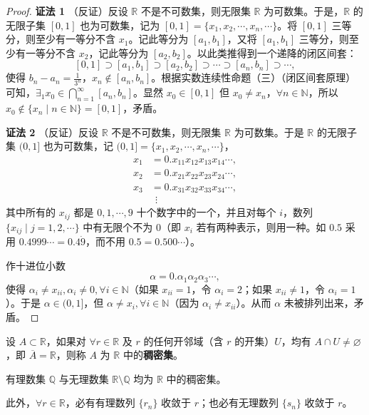 \begin{proof}
\textbf{证法 1} （反证）反设 $\mathbb{R}$ 不是不可数集，则无限集 $\mathbb{R}$ 为可数集。于是，$\mathbb{R}$ 的无限子集 $[0,1]$ 也为可数集，记为 $[0,1] = \{x_1, x_2, \cdots, x_n, \cdots\}$。将 $[0,1]$ 三等分，则至少有一等分不含 $x_1$。记此等分为 $[a_1, b_1]$，又将 $[a_1, b_1]$ 三等分，则至少有一等分不含 $x_2$，记此等分为 $[a_2, b_2]$。以此类推得到一个递降的闭区间套：
\[
[0,1] \supset [a_1, b_1] \supset [a_2, b_2] \supset \cdots \supset [a_n, b_n] \supset \cdots,
\]
使得 $b_n - a_n = \frac{1}{3^n}$，$x_n \notin [a_n, b_n]$。根据实数连续性命题（三）（闭区间套原理）可知，$\exists_1 x_0 \in \bigcap\limits_{n=1}^\infty [a_n, b_n]$。显然 $x_0 \in [0,1]$ 但 $x_0 \neq x_n$，$\forall n \in \mathbb{N}$，所以 $x_0 \notin \{x_n \mid n \in \mathbb{N}\} = [0,1]$，矛盾。

\textbf{证法 2} （反证）反设 $\mathbb{R}$ 不是不可数集，则无限集 $\mathbb{R}$ 为可数集。于是 $\mathbb{R}$ 的无限子集 $(0,1]$ 也为可数集，记 $(0,1] = \{x_1, x_2, \cdots, x_n, \cdots\}$，
\begin{align*}
x_1 &= 0.x_{11}x_{12}x_{13}x_{14}\cdots, \\
x_2 &= 0.x_{21}x_{22}x_{23}x_{24}\cdots, \\
x_3 &= 0.x_{31}x_{32}x_{33}x_{34}\cdots, \\
&\ \ \vdots
\end{align*}
其中所有的 $x_{ij}$ 都是 $0, 1, \cdots, 9$ 十个数字中的一个，并且对每个 $i$，数列 $\{x_{ij} \mid j = 1, 2, \cdots\}$ 中有无限个不为 $0$（即 $x_i$ 若有两种表示，则用一种。如 $0.5$ 采用 $0.4999\cdots = 0.4\dot{9}$，而不用 $0.5 = 0.500\cdots$）。

作十进位小数
\[
\alpha = 0.\alpha_1\alpha_2\alpha_3\cdots,
\]
使得 $\alpha_i \neq x_{ii}, \alpha_i \neq 0, \forall i \in \mathbb{N}$（如果 $x_{ii} = 1$，令 $\alpha_i = 2$；如果 $x_{ii} \neq 1$，令 $\alpha_i = 1$）。于是 $\alpha \in (0,1]$，但 $\alpha \neq x_i, \forall i \in \mathbb{N}$（因为 $\alpha_i \neq x_{ii}$）。从而 $\alpha$ 未被排列出来，矛盾。
\end{proof}

\begin{definition}\label{def:1.3.8}
设 $A \subset \mathbb{R}$，如果对 $\forall r \in \mathbb{R}$ 及 $r$ 的任何开邻域（含 $r$ 的开集）$U$，均有 $A \cap U \neq \varnothing$，即 $\overline{A} = \mathbb{R}$，则称 $A$ 为 $\mathbb{R}$ 中的\textbf{稠密集}。
\end{definition}

\begin{theorem}\label{thm:1.3.5}
有理数集 $\mathbb{Q}$ 与无理数集 $\mathbb{R} \setminus \mathbb{Q}$ 均为 $\mathbb{R}$ 中的稠密集。

此外，$\forall r \in \mathbb{R}$，必有有理数列 $\{r_n\}$ 收敛于 $r$；也必有无理数列 $\{s_n\}$ 收敛于 $r$。
\end{theorem}

